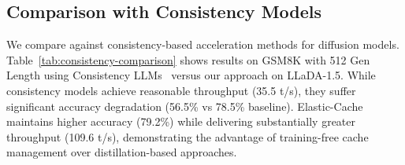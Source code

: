 \documentclass{article} %
\theoremstyle{definition}
\theoremstyle{remark}
\begin{document}
\begin{table}[!htbp]
\centering
\caption{Multimodal performance with parallel decoding on LLaDA-V (generation length 512). Format: accuracy / throughput (t/s).}
\label{tab:multimodal-parallel}
\vspace{-0.1in}
\end{table}

\subsection{Comparison with Consistency Models}

We compare against consistency-based acceleration methods for diffusion models. Table~\ref{tab:consistency-comparison} shows results on GSM8K with 512 Gen Length using Consistency LLMs~\citep{kou2024cllms} versus our approach on LLaDA-1.5. While consistency models achieve reasonable throughput (35.5 t/s), they suffer significant accuracy degradation (56.5\% vs 78.5\% baseline). Elastic-Cache maintains higher accuracy (79.2\%) while delivering substantially greater throughput (109.6 t/s), demonstrating the advantage of training-free cache management over distillation-based approaches.

\begin{table}[!htbp]
\centering
\caption{Comparison with consistency-based acceleration on GSM8K with 512 {\em Gen Length}. Our training-free approach preserves accuracy while achieving higher throughput.}
\label{tab:consistency-comparison}
\vspace{-0.1in}
\end{table}
\end{document}
